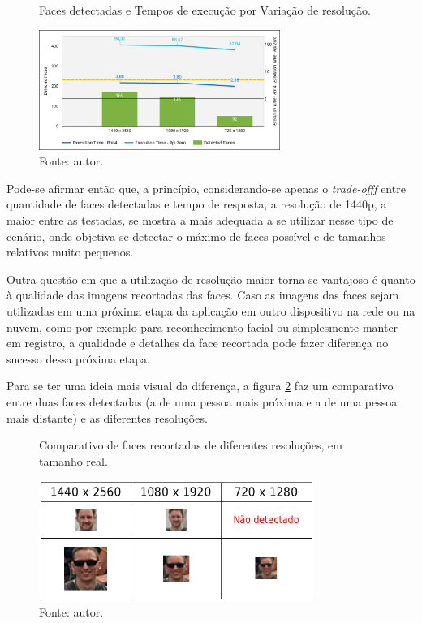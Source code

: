 \begin{figure}[h]
    \centering
    \caption[Faces detectadas e Tempos de execução por Variação de resolução.]{Faces detectadas e Tempos de execução por Variação de resolução.}
    \includegraphics[width=0.7\textwidth]{Cap4_Experimentos_Realizados/Figures/cena1_graficos_variacao_resolucao.jpg}
    \caption*{Fonte: autor.}
    \label{fig:cena1_graficos_variacao_resolucao}
\end{figure}

Pode-se afirmar então que, a princípio, considerando-se apenas o \emph{trade-offf} entre quantidade de faces detectadas e tempo de resposta, a resolução de 1440p, a maior entre as  testadas, se mostra a mais adequada a se utilizar nesse tipo de cenário, onde objetiva-se detectar o máximo de faces possível e de tamanhos relativos muito pequenos.

Outra questão em que a utilização de resolução maior torna-se vantajoso é quanto à qualidade das imagens recortadas das faces. Caso as imagens das faces sejam utilizadas em uma próxima etapa da aplicação em outro dispositivo na rede ou na nuvem, como por exemplo para reconhecimento facial ou simplesmente manter em registro, a qualidade e detalhes da face recortada pode fazer diferença no sucesso dessa próxima etapa.

Para se ter uma ideia mais visual da diferença, a figura \ref{fig:cena1_comparativo_qualidade_faces} faz um comparativo entre duas faces detectadas (a de uma pessoa mais próxima e a de uma pessoa mais distante) e as diferentes resoluções.

\begin{figure}[h]
    \centering
    \caption[Comparativo de faces recortadas de diferentes resoluções, em tamanho real.]{Comparativo de faces recortadas de diferentes resoluções, em tamanho real.}
    \includegraphics[width=0.8\textwidth]{Cap4_Experimentos_Realizados/Figures/cena1_comparativo_qualidade_faces_recortadas.jpg}
    \caption*{Fonte: autor.}
    \label{fig:cena1_comparativo_qualidade_faces}
\end{figure}

